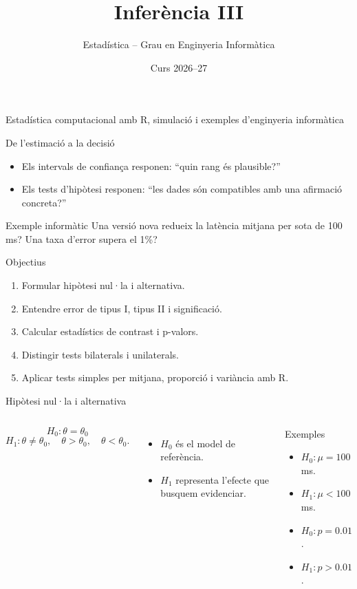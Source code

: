 \documentclass[10pt,aspectratio=169]{beamer}
\title[Inferència III]{Inferència III}
\author{Estadística -- Grau en Enginyeria Informàtica}
\date{Curs 2026--27}
\newcommand{\R}{\textsf{R}}
\begin{document}
\begin{frame}[plain]
  \titlepage
  \vspace{-0.45cm}
  \begin{center}
  \small\textcolor{DeepBlue}{Estadística computacional amb \R, simulació i exemples d'enginyeria informàtica}
  \end{center}
\end{frame}


\begin{frame}[fragile]{De l'estimació a la decisió}
\begin{itemize}
  \item Els intervals de confiança responen: ``quin rang és plausible?''
  \item Els tests d'hipòtesi responen: ``les dades són compatibles amb una afirmació concreta?''
\end{itemize}
\begin{block}{Exemple informàtic}
Una versió nova redueix la latència mitjana per sota de 100 ms? Una taxa d'error supera el 1\%?
\end{block}
\end{frame}

\begin{frame}[fragile]{Objectius}
\begin{enumerate}
  \item Formular hipòtesi nul·la i alternativa.
  \item Entendre error de tipus I, tipus II i significació.
  \item Calcular estadístics de contrast i p-valors.
  \item Distingir tests bilaterals i unilaterals.
  \item Aplicar tests simples per mitjana, proporció i variància amb \R.
\end{enumerate}
\end{frame}

\begin{frame}[fragile]{Hipòtesi nul·la i alternativa}
\begin{columns}[T]
\[
H_0: \theta=\theta_0
\]
\[
H_1: \theta\ne\theta_0,\quad \theta>\theta_0,\quad \theta<\theta_0.
\]
\begin{itemize}
  \item $H_0$ és el model de referència.
  \item $H_1$ representa l'efecte que busquem evidenciar.
\end{itemize}
\begin{block}{Exemples}
\begin{itemize}
  \item $H_0: \mu=100$ ms.
  \item $H_1: \mu<100$ ms.
  \item $H_0: p=0.01$.
  \item $H_1: p>0.01$.
\end{itemize}
\end{block}
\end{columns}
\end{frame}
\end{document}
